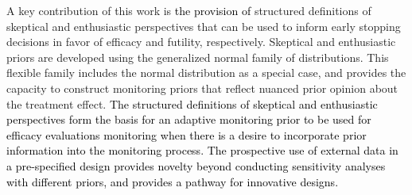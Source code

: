 \documentclass[12pt]{article}
\begin{document}
A key contribution of this work is \textcolor{black}{the provision of} structured definitions of skeptical and enthusiastic perspectives that can be used 
to inform early stopping decisions in favor of efficacy and futility, respectively. Skeptical and enthusiastic priors are developed using the generalized normal family of distributions. 
This flexible family includes the normal distribution as a special case, and provides the capacity to construct monitoring 
priors that reflect nuanced prior opinion about the treatment effect. 
%
\textcolor{black}{The structured definitions of skeptical and enthusiastic perspectives form the basis for an adaptive monitoring prior to be used for efficacy evaluations monitoring when there is a desire to incorporate prior information into the monitoring process. The prospective use of external data in a pre-specified design provides novelty beyond conducting sensitivity analyses with different priors, and provides a pathway for innovative designs.}

\end{document}
